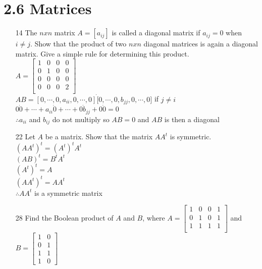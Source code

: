 \documentclass[a4paper]{article}
\newcommand\tab[1][0.5cm]{\hspace*{#1}}
\begin{document}
  \section*{2.6 Matrices}
  \begin{itemize}
    \item[14] The $n x n$ matrix $A = [a_{ij}]$ is called a diagonal matrix if $a_{ij} = 0$ when $i \neq j$. Show that the product of two $n x n$ diagonal matrices is again a diagonal matrix. Give a simple rule for determining this product. \\
    \tab $A = \left[\begin{matrix}
      1 & 0 & 0 & 0 \\
      0 & 1 & 0 & 0 \\
      0 & 0 & 0 & 0 \\
      0 & 0 & 0 & 2 \\
    \end{matrix}\right]$ \\
    \tab $AB = [0, \cdots, 0, a_{ii}, 0, \cdots, 0] \dot [0, \cdots, 0, b_{jj}, 0, \cdots, 0]$ if $j \neq i$ \\
    \tab $0 \dot 0 + \cdots + a_{ii} \dot 0 + \cdots + 0 \dot b_{jj} + 0 \dot 0 = 0$ \\
    \tab $\therefore a_{ii}$ and $b_{ij}$ do not multiply so $AB = 0$ and $AB$ is then a diagonal 
    \item[22] Let $A$ be a matrix. Show that the matrix $AA^t$ is symmetric. \\
    \tab $(AA^t)^t = (A^t)^t A^t$ \\
    \tab $(AB)^t = B^t A^t$ \\
    \tab $(A^t)^t = A$ \\
    \tab $(AA^t)^t = AA^t$ \\
    \tab $\therefore AA^t$ is a symmetric matrix
    \item[28] Find the Boolean product of $A$ and $B$, where $A =
    \left[\begin{matrix}
      1 & 0 & 0 & 1 \\
      0 & 1 & 0 & 1 \\
      1 & 1 & 1 & 1 \\
    \end{matrix}\right]$ and $B = 
    \left[\begin{matrix}
      1 & 0 \\
      0 & 1 \\
      1 & 1 \\
      1 & 0
    \end{matrix}\right]$ \\

\end{itemize}
\end{document}

